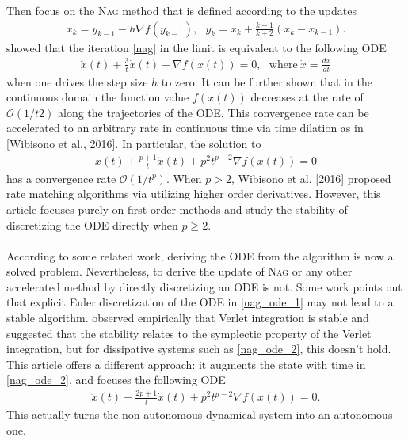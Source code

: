 Then focus on the \textsc{Nag} method that is defined according to the updates
\begin{align}\label{nag}
  x_{k} = y_{k-1} - h \nabla f(y_{k-1}),\ \ \ y_{k} = x_{k} + \frac{k-1}{k+2} (x_{k} - x_{k-1}).
\end{align}
\textcite{JMLR:v17:15-084} showed that the iteration \ref{nag} in the limit is equivalent to the
following ODE
\begin{align}\label{nag_ode_1}
  \ddot{x}(t) + \frac{3}{t} \dot{x}(t) + \nabla f(x(t)) = 0,\ \ \ \mathrm{where\ }
  \dot{x} = \frac{dx}{dt}
\end{align}
when one drives the step size $h$ to zero. It can be further shown that in the
continuous domain the function value $f(x(t))$ decreases at the rate of $\mathcal{O}(1/t2)$
along the trajectories of the ODE. This convergence rate can be accelerated to an
arbitrary rate in continuous time via time dilation as in [Wibisono et al., 2016].
In particular, the solution to
\begin{align}\label{nag_ode_2}
  \ddot{x}(t) + \frac{p+1}{t} \dot{x}(t) + p^{2}t^{p-2} \nabla f(x(t)) = 0
\end{align}
has a convergence rate $\mathcal{O}(1/t^{p})$. When $p > 2$, Wibisono et al. [2016] proposed rate matching
algorithms via utilizing higher order derivatives. However, this article focuses purely on
first-order methods and study the stability of discretizing the ODE directly when
$p \geq 2$.
\\\\According to some related work, deriving the ODE from the algorithm is now a solved
problem. Nevertheless, to derive the update of \textsc{Nag} or any other
accelerated method by directly discretizing an ODE is not. Some work points out that
explicit Euler discretization of the ODE in \ref{nag_ode_1} may not lead to a stable
algorithm. \textcite{https://doi.org/10.48550/arxiv.1802.03653} observed empirically that Verlet
integration is stable and suggested that the stability relates to the symplectic
property of the Verlet integration, but for dissipative systems such as \ref{nag_ode_2},
this doesn't hold. This article offers a different approach: it augments the state with
time in \ref{nag_ode_2}, and focuses the following ODE
\begin{align}\label{nag_ode_final}
  \ddot{x}(t) + \frac{2p+1}{t} \dot{x}(t) + p^{2}t^{p-2} \nabla f(x(t)) = 0.
\end{align}
This actually turns the non-autonomous dynamical system into an autonomous one.

